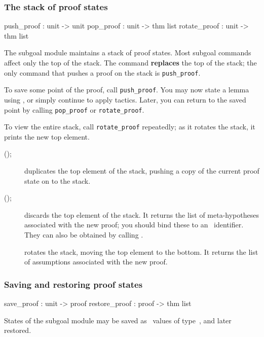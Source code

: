 \subsubsection{The stack of proof states}
\begin{ttbox} 
push_proof   : unit -> unit
pop_proof    : unit -> thm list
rotate_proof : unit -> thm list
\end{ttbox}
The subgoal module maintains a stack of proof states.  Most subgoal
commands affect only the top of the stack.  The  command {\bf
replaces} the top of the stack; the only command that pushes a proof on the
stack is {\tt push_proof}.

To save some point of the proof, call {\tt push_proof}.  You may now
state a lemma using , or simply continue to apply tactics.
Later, you can return to the saved point by calling {\tt pop_proof} or 
{\tt rotate_proof}. 

To view the entire stack, call {\tt rotate_proof} repeatedly; as it rotates
the stack, it prints the new top element.

\begin{description}
\item[();]  
duplicates the top element of the stack, pushing a copy of the current
proof state on to the stack.

\item[();]  
discards the top element of the stack.  It returns the list of
meta-hypotheses associated with the new proof;  you should bind these to an
\ML\ identifier.  They can also be obtained by calling .

\item[]  
rotates the stack, moving the top element to the bottom.  It returns the
list of assumptions associated with the new proof.
\end{description}


\subsubsection{Saving and restoring proof states}
\begin{ttbox} 
save_proof    : unit -> proof
restore_proof : proof -> thm list
\end{ttbox}
States of the subgoal module may be saved as \ML\ values of
type~, and later restored.

